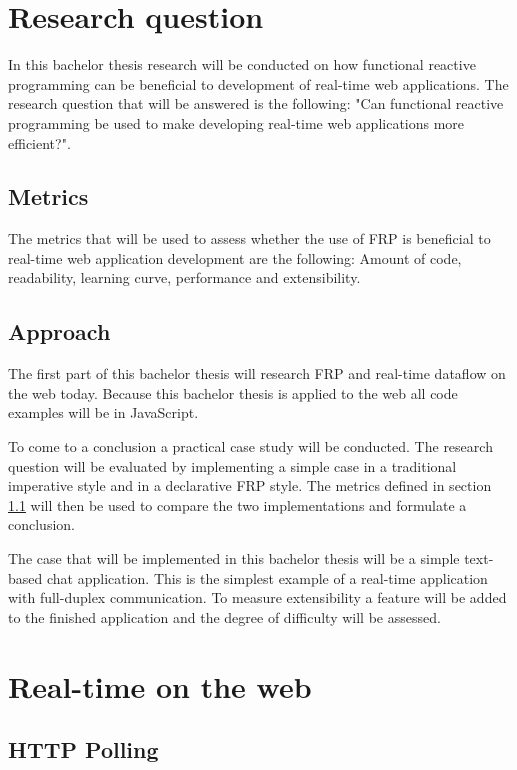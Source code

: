 \chapter{Research question}

In this bachelor thesis research will be conducted on how functional reactive programming can be beneficial to development of real-time web applications. The research question that will be answered is the following: "Can functional reactive programming be used to make developing real-time web applications more efficient?".

\section{Metrics}
\label{sec:metrics}

The metrics that will be used to assess whether the use of FRP is beneficial to real-time web application development are the following: Amount of code, readability, learning curve, performance and extensibility.

\section{Approach}

The first part of this bachelor thesis will research FRP and real-time dataflow on the web today. Because this bachelor thesis is applied to the web all code examples will be in JavaScript.

To come to a conclusion a practical case study will be conducted. The research question will be evaluated by implementing a simple case in a traditional imperative style and in a declarative FRP style. The metrics defined in section \ref{sec:metrics} will then be used to compare the two implementations and formulate a conclusion.

The case that will be implemented in this bachelor thesis will be a simple text-based chat application. This is the simplest example of a real-time application with full-duplex communication. To measure extensibility a feature will be added to the finished application and the degree of difficulty will be assessed.

\chapter{Real-time on the web} %
\label{sec:realtime}

\section{HTTP Polling} %
\label{sub:polling}

